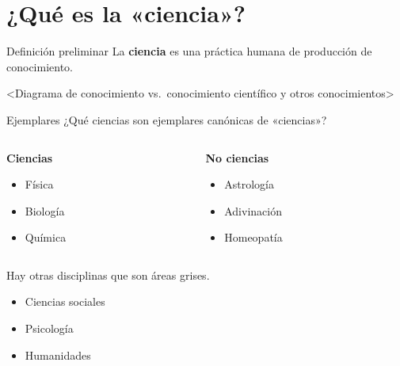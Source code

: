 \documentclass[
  ignorenonframetext,
]{beamer}
\date{}
\providecommand{\tightlist}{%
  \setlength{\itemsep}{0pt}\setlength{\parskip}{0pt}}
\begin{document}
\hypertarget{quuxe9-es-la-ciencia}{%
\section{¿Qué es la «ciencia»?}\label{quuxe9-es-la-ciencia}}

\begin{frame}{Definición preliminar}
\protect\hypertarget{definiciuxf3n-preliminar}{}
La \textbf{ciencia} es una práctica humana de producción de
conocimiento.

\textless Diagrama de conocimiento vs.~conocimiento científico y otros
conocimientos\textgreater{}
\end{frame}

\begin{frame}{Ejemplares}
\protect\hypertarget{ejemplares}{}
¿Qué ciencias son ejemplares canónicas de «ciencias»?

\begin{columns}[T]
\begin{column}{0.48\textwidth}
\textbf{Ciencias}

\begin{itemize}
\tightlist
\item
  Física
\item
  Biología
\item
  Química
\end{itemize}
\end{column}

\begin{column}{0.48\textwidth}
\textbf{No ciencias}

\begin{itemize}
\tightlist
\item
  Astrología
\item
  Adivinación
\item
  Homeopatía
\end{itemize}
\end{column}
\end{columns}

Hay otras disciplinas que son áreas grises.

\begin{itemize}
\tightlist
\item
  Ciencias sociales
\item
  Psicología
\item
  Humanidades
\end{itemize}
\end{frame}
\end{document}
